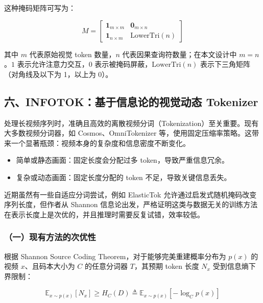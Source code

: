 这种掩码矩阵可写为：

\[
M=
\begin{bmatrix}
\mathbf{1}_{m\times m} & \mathbf{0}_{m\times n} \\
\mathbf{1}_{n\times m} & \mathrm{LowerTri}(n)
\end{bmatrix}
\]

其中 \(m\) 代表原始视觉 token 数量，\(n\) 代表因果查询符数量；在本文设计中 \(m=n\)。\(1\) 表示允许注意力交互，\(0\) 表示被掩码屏蔽，\(\mathrm{LowerTri}(n)\) 表示下三角矩阵（对角线及以下为 1，以上为 0）。

\hypertarget{ux516dinfotokux57faux4e8eux4fe1ux606fux8bbaux7684ux89c6ux89c9ux52a8ux6001-tokenizer}{%
\subsection{六、INFOTOK：基于信息论的视觉动态 Tokenizer}\label{ux516dinfotokux57faux4e8eux4fe1ux606fux8bbaux7684ux89c6ux89c9ux52a8ux6001-tokenizer}}

处理长视频序列时，准确且高效的离散视频分词（Tokenization）至关重要。现有大多数视频分词器，如 Cosmos、OmniTokenizer 等，使用固定压缩率策略。这带来一个显著瓶颈：视频本身的复杂度和信息密度不断变化。

\begin{itemize}
\tightlist
\item
  简单或静态画面：固定长度会分配过多 token，导致严重信息冗余。
\item
  复杂或动态画面：固定长度分配的 token 不足，导致关键信息丢失。
\end{itemize}

近期虽然有一些自适应分词尝试，例如 ElasticTok 允许通过启发式随机掩码改变序列长度，但作者从 Shannon 信息论出发，严格证明这类与数据无关的训练方法在表示长度上是次优的，并且推理时需要反复试错，效率较低。

\hypertarget{ux4e00ux73b0ux6709ux65b9ux6cd5ux7684ux6b21ux4f18ux6027}{%
\subsubsection{（一）现有方法的次优性}\label{ux4e00ux73b0ux6709ux65b9ux6cd5ux7684ux6b21ux4f18ux6027}}

根据 Shannon Source Coding Theorem，对于能够完美重建概率分布为 \(p(x)\) 的视频 \(x\)、且码本大小为 \(C\) 的任意分词器 \(T\)，其预期 token 长度 \(N_x\) 受到信息熵下界限制：

\[
\mathbb{E}_{x\sim p(x)}[N_x]\ge H_C(D)
\triangleq
\mathbb{E}_{x\sim p(x)}[-\log_C p(x)]
\]

